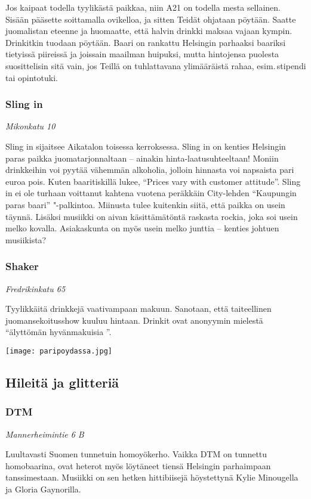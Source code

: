 \documentclass[../ala_hataile.tex]{subfiles}
\begin{document}
Jos kaipaat todella tyylikästä paikkaa,
niin A21 on todella mesta sellainen. Sisään
pääsette soittamalla ovikelloa, ja sitten Teidät
ohjataan pöytään. Saatte juomalistan
eteenne ja huomaatte, että halvin drinkki
maksaa vajaan kympin. Drinkitkin tuodaan
pöytään. Baari on rankattu Helsingin parhaaksi
baariksi tietyissä piireissä ja joissain
maailman huipuksi, mutta hintojensa
puolesta suosittelisin sitä vain, jos Teillä on
tuhlattavana ylimääräistä rahaa, esim.\,stipendi
tai opintotuki.
\subsubsection*{Sling in}
\textit{Mikonkatu 10}

Sling in sijaitsee Aikatalon toisessa
kerroksessa. Sling in on kenties Helsingin
paras paikka juomatarjonnaltaan -- ainakin
hinta-laatusuhteeltaan! Moniin drinkkeihin
voi pyytää vähemmän alkoholia, jolloin
hinnasta voi napsaista pari euroa pois.
Kuten baaritiskillä lukee, ``Prices vary with
customer attitude''. Sling in ei ole turhaan
voittanut kahtena vuotena peräkkäin
City-lehden ``Kaupungin paras baari'' "-palkintoa.
Miinusta tulee kuitenkin siitä, että
paikka on usein täynnä. Lisäksi musiikki
on aivan käsittämätöntä raskasta rockia,
joka soi usein melko kovalla. Asiakaskunta
on myös usein melko junttia -- kenties johtuen
musiikista?
\subsubsection*{Shaker}
\textit{Fredrikinkatu 65}

Tyylikkäitä drinkkejä vaativampaan makuun.
Sanotaan, että taiteellinen juomansekoitusshow
kuuluu hintaan. Drinkit ovat
anonyymin mielestä ``älyttömän hyvänmakuisia
\smiley''.

\begin{figure*}[!b]
	\centering
	\texttt{[image: paripoydassa.jpg]}
\end{figure*}
\subsection*{Hileitä ja glitteriä}

\subsubsection*{DTM}
\textit{Mannerheimintie 6 B}

Luultavasti Suomen tunnetuin homo\-yökerho.
Vaikka DTM on tunnettu homobaarina,
ovat heterot myös löytäneet tiensä
Helsingin parhaimpaan tanssimestaan. Musiikki
on sen hetken hittibiisejä höystettynä
Kylie Minougella ja Gloria Gaynorilla.
\end{document}
